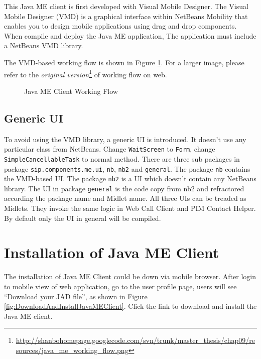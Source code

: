 This Java ME client is first developed with Visual Mobile Designer. The Visual Mobile Designer (VMD) is a graphical interface within NetBeans Mobility that enables you to design mobile applications using drag and drop components. When compile and deploy the Java ME application, The application must include a NetBeans VMD library.

The VMD-based working flow is shown in Figure \ref{fig:JavaMEClientWorkingFlow}. For a larger image, please refer to the \textit{original version}\footnote{\url{http://shanbohomepage.googlecode.com/svn/trunk/master_thesis/chap09/resources/java_me_working_flow.png}} of working flow on web. 

\begin{figure}[!hbtp]
\centering
{}
\caption{Java ME Client Working Flow}
\label{fig:JavaMEClientWorkingFlow}
\end{figure}


\subsection{Generic UI}
\label{sec:JavaMEClient:UserInterface:GenericUI}

To avoid using the VMD library, a generic UI is introduced. It doesn't use any particular class from NetBeans. Change \texttt{WaitScreen} to \texttt{Form}, change \\ \texttt{SimpleCancellableTask} to normal method. There are three sub packages in package \texttt{sip.components.me.ui}, \texttt{nb}, \texttt{nb2} and \texttt{general}. The package \texttt{nb} contains the VMD-based UI. The package \texttt{nb2} is a UI which doesn't contain any NetBeans library. The UI in package \texttt{general} is the code copy from nb2 and refractored according the package name and Midlet name. All three UIs can be treaded as Midlets.  They invoke the same logic in \textsf{Web Call Client} and \textsf{PIM Contact Helper}. By default only the UI in general will be compiled.

\section{Installation of Java ME Client}
\label{sec:JavaMEClient:InstallationOfJavaMEClient}

The installation of Java ME Client could be down via mobile browser. After login to mobile view of web application, go to the user profile page, users will see ``Download your JAD file'', as shown in Figure \ref{fig:DownloadAndInstallJavaMEClient}. Click the link to download and install the Java ME client.

